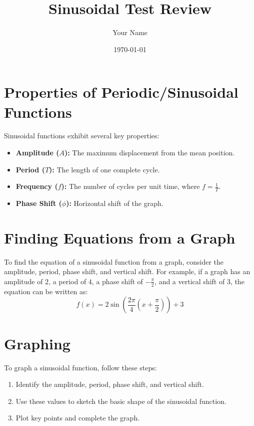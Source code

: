 \documentclass{article}
\title{Sinusoidal Test Review}
\author{Your Name}
\date{\today}
\begin{document}
\maketitle

\section*{Properties of Periodic/Sinusoidal Functions}
Sinusoidal functions exhibit several key properties:
\begin{itemize}
    \item \textbf{Amplitude ($A$):} The maximum displacement from the mean position.
    \item \textbf{Period ($T$):} The length of one complete cycle.
    \item \textbf{Frequency ($f$):} The number of cycles per unit time, where $f = \frac{1}{T}$.
    \item \textbf{Phase Shift ($\phi$):} Horizontal shift of the graph.
\end{itemize}

\section*{Finding Equations from a Graph}
To find the equation of a sinusoidal function from a graph, consider the amplitude, period, phase shift, and vertical shift. For example, if a graph has an amplitude of $2$, a period of $4$, a phase shift of $-\frac{\pi}{2}$, and a vertical shift of $3$, the equation can be written as:
\[ f(x) = 2 \sin\left(\frac{2\pi}{4}(x + \frac{\pi}{2})\right) + 3 \]

\section*{Graphing}
To graph a sinusoidal function, follow these steps:
\begin{enumerate}
    \item Identify the amplitude, period, phase shift, and vertical shift.
    \item Use these values to sketch the basic shape of the sinusoidal function.
    \item Plot key points and complete the graph.
\end{enumerate}
\end{document}
